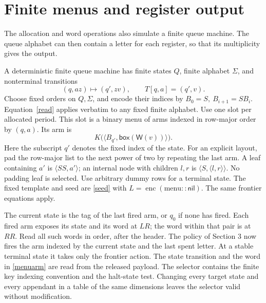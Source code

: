 \documentclass[11pt,letterpaper,oneside,reqno]{amsart}
\newcommand{\pair}[2]{\langle #1,#2\rangle}
\newcommand{\word}{\mathsf W}
\newcommand{\bx}[1]{\mathsf{box}(#1)}
\begin{document}
\section{Finite menus and register output}\label{numeric}
The allocation and word operations also simulate a finite queue machine. The queue alphabet can then contain a letter for each register, so that its multiplicity gives the output.

A deterministic finite queue machine has finite states \(Q\), finite alphabet \(\Sigma\), and nonterminal transitions
\[
       (q,a z)\longmapsto(q',zv),\qquad T[q,a]=(q',v).
\]
Choose fixed orders on \(Q,\Sigma\), and encode their indices by \(B_0=S,\ B_{i+1}=S B_i\). Equation~\eqref{read} applies verbatim to any fixed finite alphabet. Use one slot per allocated period. This slot is a binary menu of arms indexed in row-major order by \((q,a)\). Its arm is
\begin{equation}
                     K\bigl(\pair{B_{q'}}{\bx{\word(v)}}\bigr).       \label{menuarm}
\end{equation}
Here the subscript \(q'\) denotes the fixed index of the state. For an explicit layout, pad the row-major list to the next power of two by repeating the last arm. A leaf containing \(a'\) is \(\pair{SS}{a'}\); an internal node with children \(l,r\) is \(\pair{S}{\pair l r}\). No padding leaf is selected. Use arbitrary dummy rows for a terminal state. The fixed template and seed are \eqref{seed} with \(L=\operatorname{enc}(\mathrm{menu}::\mathsf{nil})\). The same frontier equations apply.

The current state is the tag of the last fired arm, or \(q_0\) if none has fired. Each fired arm exposes its state and its word at \(LR\); the word within that pair is at \(RR\). Read all such words in order, after the header. The policy of Section 3 now fires the arm indexed by the current state and the last spent letter. At a stable terminal state it takes only the frontier action. The state transition and the word in \eqref{menuarm} are read from the released payload. The selector contains the finite key indexing convention and the halt-state test. Changing every target state and every appendant in a table of the same dimensions leaves the selector valid without modification.
\end{document}
